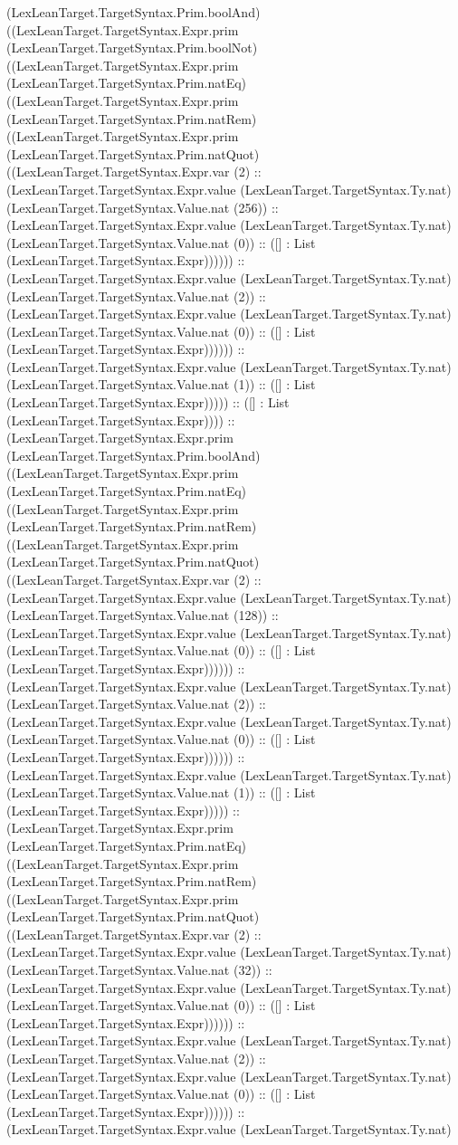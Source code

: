 \documentclass[11pt]{article}
\begin{document}
(LexLeanTarget.TargetSyntax.Prim.boolAnd) ((LexLeanTarget.TargetSyntax.Expr.prim (LexLeanTarget.TargetSyntax.Prim.boolNot) ((LexLeanTarget.TargetSyntax.Expr.prim (LexLeanTarget.TargetSyntax.Prim.natEq) ((LexLeanTarget.TargetSyntax.Expr.prim (LexLeanTarget.TargetSyntax.Prim.natRem) ((LexLeanTarget.TargetSyntax.Expr.prim (LexLeanTarget.TargetSyntax.Prim.natQuot) ((LexLeanTarget.TargetSyntax.Expr.var (2) :: (LexLeanTarget.TargetSyntax.Expr.value (LexLeanTarget.TargetSyntax.Ty.nat) (LexLeanTarget.TargetSyntax.Value.nat (256)) :: (LexLeanTarget.TargetSyntax.Expr.value (LexLeanTarget.TargetSyntax.Ty.nat) (LexLeanTarget.TargetSyntax.Value.nat (0)) :: ([] : List (LexLeanTarget.TargetSyntax.Expr)))))) :: (LexLeanTarget.TargetSyntax.Expr.value (LexLeanTarget.TargetSyntax.Ty.nat) (LexLeanTarget.TargetSyntax.Value.nat (2)) :: (LexLeanTarget.TargetSyntax.Expr.value (LexLeanTarget.TargetSyntax.Ty.nat) (LexLeanTarget.TargetSyntax.Value.nat (0)) :: ([] : List (LexLeanTarget.TargetSyntax.Expr)))))) :: (LexLeanTarget.TargetSyntax.Expr.value (LexLeanTarget.TargetSyntax.Ty.nat) (LexLeanTarget.TargetSyntax.Value.nat (1)) :: ([] : List (LexLeanTarget.TargetSyntax.Expr))))) :: ([] : List (LexLeanTarget.TargetSyntax.Expr)))) :: (LexLeanTarget.TargetSyntax.Expr.prim (LexLeanTarget.TargetSyntax.Prim.boolAnd) ((LexLeanTarget.TargetSyntax.Expr.prim (LexLeanTarget.TargetSyntax.Prim.natEq) ((LexLeanTarget.TargetSyntax.Expr.prim (LexLeanTarget.TargetSyntax.Prim.natRem) ((LexLeanTarget.TargetSyntax.Expr.prim (LexLeanTarget.TargetSyntax.Prim.natQuot) ((LexLeanTarget.TargetSyntax.Expr.var (2) :: (LexLeanTarget.TargetSyntax.Expr.value (LexLeanTarget.TargetSyntax.Ty.nat) (LexLeanTarget.TargetSyntax.Value.nat (128)) :: (LexLeanTarget.TargetSyntax.Expr.value (LexLeanTarget.TargetSyntax.Ty.nat) (LexLeanTarget.TargetSyntax.Value.nat (0)) :: ([] : List (LexLeanTarget.TargetSyntax.Expr)))))) :: (LexLeanTarget.TargetSyntax.Expr.value (LexLeanTarget.TargetSyntax.Ty.nat) (LexLeanTarget.TargetSyntax.Value.nat (2)) :: (LexLeanTarget.TargetSyntax.Expr.value (LexLeanTarget.TargetSyntax.Ty.nat) (LexLeanTarget.TargetSyntax.Value.nat (0)) :: ([] : List (LexLeanTarget.TargetSyntax.Expr)))))) :: (LexLeanTarget.TargetSyntax.Expr.value (LexLeanTarget.TargetSyntax.Ty.nat) (LexLeanTarget.TargetSyntax.Value.nat (1)) :: ([] : List (LexLeanTarget.TargetSyntax.Expr))))) :: (LexLeanTarget.TargetSyntax.Expr.prim (LexLeanTarget.TargetSyntax.Prim.natEq) ((LexLeanTarget.TargetSyntax.Expr.prim (LexLeanTarget.TargetSyntax.Prim.natRem) ((LexLeanTarget.TargetSyntax.Expr.prim (LexLeanTarget.TargetSyntax.Prim.natQuot) ((LexLeanTarget.TargetSyntax.Expr.var (2) :: (LexLeanTarget.TargetSyntax.Expr.value (LexLeanTarget.TargetSyntax.Ty.nat) (LexLeanTarget.TargetSyntax.Value.nat (32)) :: (LexLeanTarget.TargetSyntax.Expr.value (LexLeanTarget.TargetSyntax.Ty.nat) (LexLeanTarget.TargetSyntax.Value.nat (0)) :: ([] : List (LexLeanTarget.TargetSyntax.Expr)))))) :: (LexLeanTarget.TargetSyntax.Expr.value (LexLeanTarget.TargetSyntax.Ty.nat) (LexLeanTarget.TargetSyntax.Value.nat (2)) :: (LexLeanTarget.TargetSyntax.Expr.value (LexLeanTarget.TargetSyntax.Ty.nat) (LexLeanTarget.TargetSyntax.Value.nat (0)) :: ([] : List (LexLeanTarget.TargetSyntax.Expr)))))) :: (LexLeanTarget.TargetSyntax.Expr.value (LexLeanTarget.TargetSyntax.Ty.nat) 
\end{document}
